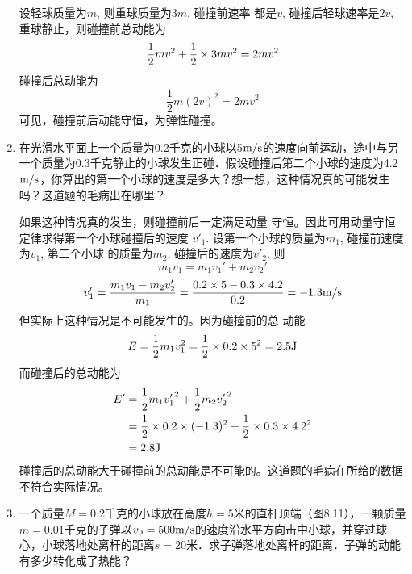 \begin{enumerate}
\begin{solution}
    设轻球质量为$m$, 则重球质量为$3m$. 碰撞前速率
    都是$v$, 碰撞后轻球速率是$2v$, 重球静止，则碰撞前总动能为
   \[\frac{1}{2}mv^2+\frac{1}{2}\times 3mv^2=2mv^2\]
    碰撞后总动能为
\[\frac{1}{2}m(2v)^2=2mv^2\]
    可见，碰撞前后动能守恒，为弹性碰撞。
\end{solution}
   \item 在光滑水平面上一个质量为0.2千克的小球以5$\text{m}/\text{s}$的速度向前运动，途中与另一个质量为0.3千克静止的小球发生正碰．假设碰撞后第二个小球的速度为4.2$\text{m}/\text{s}$，你算出的第一个小球的速度是多大？想一想，这种情况真的可能发生吗？这道题的毛病出在哪里？

   \begin{solution}
    如果这种情况真的发生，则碰撞前后一定满足动量
    守恒。因此可用动量守恒定律求得第一个小球碰撞后的速度
    $v'_1$. 设第一个小球的质量为$m_1$, 碰撞前速度为$v_1$, 第二个小球
    的质量为$m_2$, 碰撞后的速度为$v'_2$. 则
\[m_1v_1=m_1v_1'+m_2v_2'\]
\[v'_1=\frac{m_1v_1-m_2v_2'}{m_1}=\frac{0.2\times 5-0.3\times 4.2}{0.2}=-1.3\text{m}/\text{s}\]
但实际上这种情况是不可能发生的。因为碰撞前的总
动能
\[E=\frac{1}{2}m_1v_1^2=\frac{1}{2}\times 0.2\times 5^2=2.5{\rm J}\]
而碰撞后的总动能为
\[\begin{split}
    E'&=\frac{1}{2}m_1{v'_1}^2+\frac{1}{2}m_2{v'_2}^2\\
    &=\frac{1}{2}\times 0.2\times (-1.3)^2+\frac{1}{2}\times 0.3\times 4.2^2\\
    &=2.8{\rm J}
\end{split}\]
碰撞后的总动能大于碰撞前的总动能是不可能的。这道题的毛病在所给的数据不符合实际情况。
   \end{solution}
   \item 一个质量$M=0.2$千克的小球放在高度$h=5$米的直杆顶端（图8.11），一颗质量$m=0.01$千克的子弹以$v_0=500\text{m}/\text{s}$的速度沿水平方向击中小球，并穿过球心，小球落地处离杆的距离$s=20$米．求子弹落地处离杆的距离．子弹的动能有多少转化成了热能？
   \begin{figure}[htp]\centering
\end{figure}
\end{enumerate}
